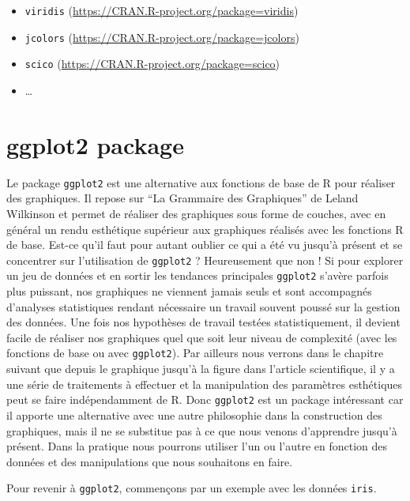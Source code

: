 \documentclass[]{book}
\providecommand{\tightlist}{%
  \setlength{\itemsep}{0pt}\setlength{\parskip}{0pt}}
\begin{document}
\begin{itemize}
\tightlist
\item
  \texttt{viridis} (\url{https://CRAN.R-project.org/package=viridis})
\item
  \texttt{jcolors} (\url{https://CRAN.R-project.org/package=jcolors})
\item
  \texttt{scico} (\url{https://CRAN.R-project.org/package=scico})
\item
  \ldots{}
\end{itemize}

\hypertarget{ggplot2-package}{%
\section{ggplot2 package}\label{ggplot2-package}}

Le package \texttt{ggplot2} est une alternative aux fonctions de base de R pour réaliser des graphiques. Il repose sur ``La Grammaire des Graphiques'' de Leland Wilkinson et permet de réaliser des graphiques sous forme de couches, avec en général un rendu esthétique supérieur aux graphiques réalisés avec les fonctions R de base. Est-ce qu'il faut pour autant oublier ce qui a été vu jusqu'à présent et se concentrer sur l'utilisation de \texttt{ggplot2} ? Heureusement que non ! Si pour explorer un jeu de données et en sortir les tendances principales \texttt{ggplot2} s'avère parfois plus puissant, nos graphiques ne viennent jamais seuls et sont accompagnés d'analyses statistiques rendant nécessaire un travail souvent poussé sur la gestion des données. Une fois nos hypothèses de travail testées statistiquement, il devient facile de réaliser nos graphiques quel que soit leur niveau de complexité (avec les fonctions de base ou avec \texttt{ggplot2}). Par ailleurs nous verrons dans le chapitre suivant que depuis le graphique jusqu'à la figure dans l'article scientifique, il y a une série de traitements à effectuer et la manipulation des paramètres esthétiques peut se faire indépendamment de R. Donc \texttt{ggplot2} est un package intéressant car il apporte une alternative avec une autre philosophie dans la construction des graphiques, mais il ne se substitue pas à ce que nous venons d'apprendre jusqu'à présent. Dans la pratique nous pourrons utiliser l'un ou l'autre en fonction des données et des manipulations que nous souhaitons en faire.

Pour revenir à \texttt{ggplot2}, commençons par un exemple avec les données \texttt{iris}.
\end{document}
